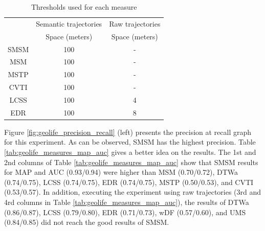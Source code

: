 \documentclass[12pt]{article}
\begin{document}
\begin{table}[!h]
\scriptsize
  \centering
  \begin{tabular}{|c|c|c|}
  	\hline
  & \multicolumn{1}{c|}{Semantic trajectories} & \multicolumn{1}{c|}{Raw trajectories} \\
 	\cline{2-3}
  & Space (meters) & Space (meters) \\
  	\hline
 SMSM & 100 & - \\
 MSM & 100 & - \\
 MSTP & 100 & -  \\
 CVTI & 100 & - \\
 LCSS & 100 & 4 \\
 EDR & 100 & 8 \\
    \hline
  \end{tabular}
  \caption{Thresholds used for each measure}
  \label{tab:geolife_thresholds}
\end{table}

Figure \ref{fig:geolife_precision_recall} (left) presents the precision at recall graph for this experiment. As can be observed, SMSM has the highest precision. Table \ref{tab:geolife_measures_map_auc} gives a better idea on the results. The 1st and 2nd columns of Table \ref{tab:geolife_measures_map_auc} show that SMSM results for MAP and AUC (0.93/0.94) were higher than MSM (0.70/0.72), DTWa (0.74/0.75), LCSS (0.74/0.75), EDR (0.74/0.75), MSTP (0.50/0.53), and CVTI (0.53/0.57). In addition, executing the experiment using raw trajectories (3rd and 4rd columns in Table \ref{tab:geolife_measures_map_auc}), the results of DTWa (0.86/0.87), LCSS (0.79/0.80), EDR (0.71/0.73), wDF (0.57/0.60), and UMS (0.84/0.85) did not reach the good results of SMSM.
\end{document}

